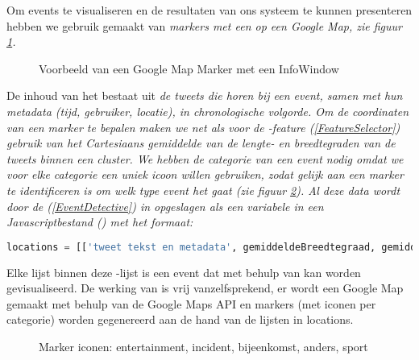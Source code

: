 {{Om events te visualiseren en de resultaten van ons systeem te kunnen presenteren 
hebben we gebruik gemaakt van \it{markers} met een  op een \it{Google Map}, zie 
figuur \ref{mapmarker}.

\begin{figure}[H]
  \centering
    \caption{Voorbeeld van een Google Map Marker met een InfoWindow}
  \label{mapmarker}
\end{figure}

De inhoud van het  bestaat uit \it{de tweets die horen bij een event, 
samen met hun metadata (tijd, gebruiker, locatie)}, in chronologische volgorde. 
Om de coordinaten van een marker te bepalen maken we net als voor de 
-feature (\ref{FeatureSelector}) gebruik van het \it{Cartesiaans gemiddelde van de lengte- 
en breedtegraden} van de tweets binnen een cluster. We hebben de \it{categorie} van 
een event nodig omdat we voor elke categorie een uniek icoon willen gebruiken, 
zodat gelijk aan een marker te identificeren is om welk type event het gaat (zie 
figuur \ref{markers}). Al deze data wordt door de  (\ref{EventDetective}) in  
opgeslagen als een variabele in een Javascriptbestand () 
met het formaat:

\begin{lstlisting}[language=Python]
locations = [['tweet tekst en metadata', gemiddeldeBreedtegraad, gemiddeldeLengtegraad, 'categorielabel'], ...] 
\end{lstlisting}

Elke lijst binnen deze -lijst is een event dat met behulp van 
 kan worden gevisualiseerd. De werking van  is 
vrij vanzelfsprekend, er wordt een Google Map gemaakt met behulp van de Google 
Maps API en markers (met iconen per categorie) worden gegenereerd aan de hand 
van de lijsten in locations.

\begin{figure}[H]
  \centering
    \caption{Marker iconen: entertainment, incident, bijeenkomst, anders, sport}
  \label{markers}
\end{figure}

}}

